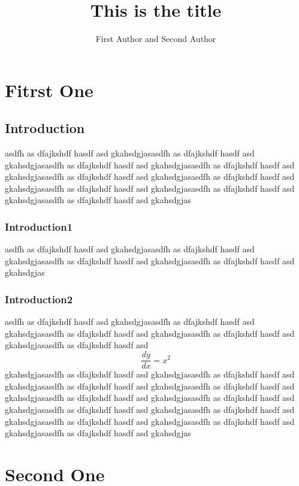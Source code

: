 \documentclass{book}
\begin{document}
\title{This is the title}
\author{First Author and Second Author}
\tableofcontents
\maketitle
\chapter{Fitrst One}
\section{Introduction}
asdfh as dfajkshdf hasdf asd gkahsdgjasasdfh as dfajkshdf hasdf asd gkahsdgjasasdfh as dfajkshdf hasdf asd gkahsdgjasasdfh as dfajkshdf hasdf asd gkahsdgjasasdfh as dfajkshdf hasdf asd gkahsdgjasasdfh as dfajkshdf hasdf asd gkahsdgjasasdfh as dfajkshdf hasdf asd gkahsdgjasasdfh as dfajkshdf hasdf asd gkahsdgjasasdfh as dfajkshdf hasdf asd gkahsdgjas
\subsection{Introduction1}
asdfh as dfajkshdf hasdf asd gkahsdgjasasdfh as dfajkshdf hasdf asd gkahsdgjasasdfh as dfajkshdf hasdf asd gkahsdgjasasdfh as dfajkshdf hasdf asd gkahsdgjas
\subsection{Introduction2}
asdfh as dfajkshdf hasdf asd gkahsdgjasasdfh as dfajkshdf hasdf asd gkahsdgjasasdfh as dfajkshdf hasdf asd gkahsdgjasasdfh as dfajkshdf hasdf asd gkahsdgjasasdfh as dfajkshdf hasdf asd 
\begin{equation}
\frac{dy}{dx} = x^2
\end{equation}
gkahsdgjasasdfh as dfajkshdf hasdf asd gkahsdgjasasdfh as dfajkshdf hasdf asd gkahsdgjasasdfh as dfajkshdf hasdf asd gkahsdgjasasdfh as dfajkshdf hasdf asd gkahsdgjasasdfh as dfajkshdf hasdf asd gkahsdgjasasdfh as dfajkshdf hasdf asd gkahsdgjasasdfh as dfajkshdf hasdf asd gkahsdgjasasdfh as dfajkshdf hasdf asd gkahsdgjasasdfh as dfajkshdf hasdf asd gkahsdgjasasdfh as dfajkshdf hasdf asd gkahsdgjasasdfh as dfajkshdf hasdf asd gkahsdgjas

\chapter{Second One}
\end{document}
